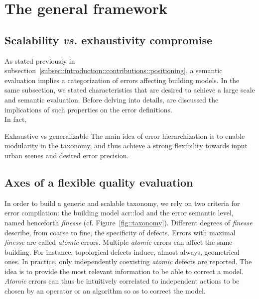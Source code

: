 \minitoc

\vfill

\clearpage

\section{The general framework}

    \subsection{Scalability \textit{vs.} exhaustivity compromise}
        As stated previously in subsection~\ref{subsec::introduction::contributions::positioning}, a semantic evaluation implies a categorization of errors affecting building models.
        In the same subsection, we stated characteristics that are desired to achieve a large scale and semantic evaluation.
        Before delving into details, are discussed the implications of such properties on the error definitions.\\

        In fact,         

        Exhaustive vs generalizable
        The main idea of error hierarchization is to enable modularity in the taxonomy, and thus achieve a strong flexibility towards input urban scenes and desired error precision.

    \subsection{Axes of a flexible quality evaluation}
        In order to build a generic and scalable taxonomy, we rely on two criteria for error compilation: the building model \gls{acr::lod} and the error semantic level, named henceforth \textit{finesse} (cf. Figure~\ref{fig::taxonomy}).
        Different degrees of \textit{finesse} describe, from coarse to fine, the specificity of defects.
        Errors with maximal \textit{finesse} are called \textit{atomic} errors.
        Multiple \textit{atomic} errors can affect the same building.
        For instance, topological defects induce, almost always, geometrical ones.
        In practice, only independently coexisting \textit{atomic} defects are reported.
        The idea is to provide the most relevant information to be able to correct a model.
        \textit{Atomic} errors can thus be intuitively correlated to independent actions to be chosen by an operator or an algorithm so as to correct the model.


